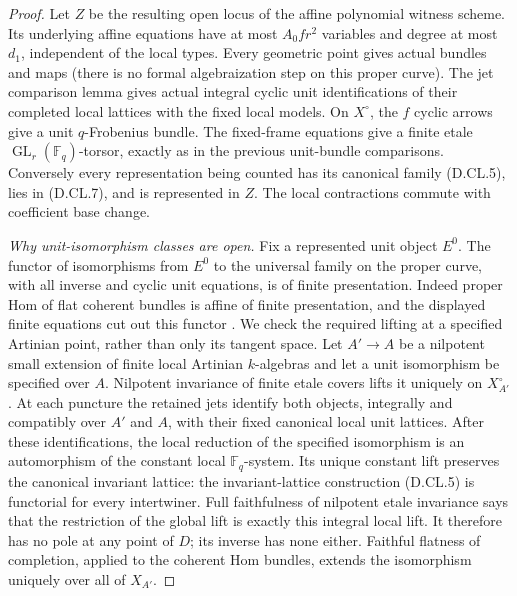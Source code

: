 \begin{proof}
Let $Z$ be the resulting open locus of the affine polynomial
witness scheme. Its underlying affine equations have at most
$A_0fr^2$ variables and degree at most $d_1$, independent of the
local types. Every geometric point gives actual bundles and maps
(there is no formal algebraization step on this proper curve).
The jet comparison lemma gives actual integral cyclic unit
identifications of their completed local lattices with the fixed
local models. On $X^\circ$, the $f$ cyclic arrows give a unit
$q$-Frobenius bundle. The fixed-frame equations give a finite etale
$\operatorname{GL}_r(\mathbb F_q)$-torsor, exactly as in the
previous unit-bundle comparisons. Conversely every representation
being counted has its canonical family (D.CL.5), lies in (D.CL.7),
and is represented in $Z$. The local contractions commute with
coefficient base change.

\emph{Why unit-isomorphism classes are open.}
Fix a represented unit object $E^0$. The functor of isomorphisms
from $E^0$ to the universal family on the proper curve, with all
inverse and cyclic unit equations, is of finite presentation.
Indeed proper Hom of flat coherent bundles is affine of finite
presentation, and the displayed finite equations cut out this
functor
\citep[Proposition~99.3.10, Tag~08K6, and the stated inverse equations]
{StacksUnitJetTransferD}.
We check the required lifting at a specified Artinian point, rather
than only its tangent space. Let $A'\to A$ be a nilpotent small
extension of finite local Artinian $k$-algebras and let a unit
isomorphism be specified over $A$. Nilpotent invariance of finite
etale covers lifts it uniquely on $X^\circ_{A'}$
\citep[Lemma~58.8.3, Tag~0BQB, complete proof]
{StacksUnitJetTransferD}.
At each puncture the retained jets identify both objects, integrally
and compatibly over $A'$ and $A$, with their fixed canonical local
unit lattices. After these identifications, the local reduction
of the specified isomorphism is an automorphism of the constant
local $\mathbb F_q$-system. Its unique constant lift preserves the
canonical invariant lattice: the invariant-lattice construction
(D.CL.5) is functorial for every intertwiner. Full faithfulness of
nilpotent etale invariance says that the restriction of the global
lift is exactly this integral local lift. It therefore has no
pole at any point of $D$; its inverse has none either. Faithful
flatness of completion, applied to the coherent Hom bundles,
extends the isomorphism uniquely over all of $X_{A'}$.


\end{proof}
